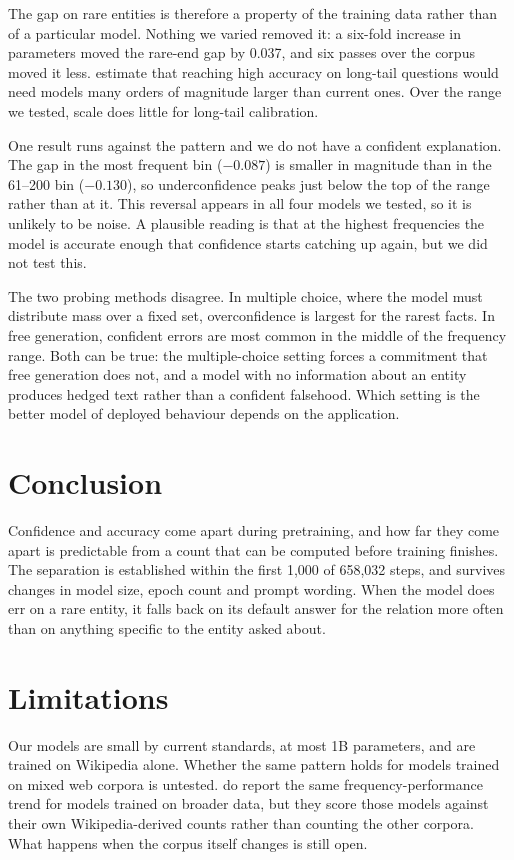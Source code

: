 \documentclass[11pt]{article}
\begin{document}
The gap on rare entities is therefore a property of the training data rather than of a
particular model. Nothing we varied removed it: a six-fold increase in parameters moved the
rare-end gap by 0.037, and six passes over the corpus moved it less. \citet{kandpal-etal-2023-large} estimate that reaching high accuracy on long-tail questions
would need models many orders of magnitude larger than current ones. Over the range we tested,
scale does little for long-tail calibration.

One result runs against the pattern and we do not have a confident explanation. The gap in the
most frequent bin ($-0.087$) is smaller in magnitude than in the 61--200 bin ($-0.130$), so
underconfidence peaks just below the top of the range rather than at it. This reversal appears in
all four models we tested, so it is unlikely to be noise. A plausible reading is that at the highest
frequencies the model is accurate enough that confidence starts catching up again, but we did not
test this.

The two probing methods disagree. In multiple choice, where the model
must distribute mass over a fixed set, overconfidence is largest for the rarest facts. In free
generation, confident errors are most common in the middle of the frequency range. Both can be
true: the multiple-choice setting forces a commitment that free generation does not, and a model
with no information about an entity produces hedged text rather than a confident falsehood. Which
setting is the better model of deployed behaviour depends on the application.

\section{Conclusion}

Confidence and accuracy come apart during pretraining, and how far they come apart is predictable
from a count that can be computed before training finishes. The separation is established within
the first 1{,}000 of 658{,}032 steps, and survives changes in model size, epoch count and prompt
wording. When the model does err on a rare entity, it falls back on its default answer for the
relation more often than on anything specific to the entity asked about.

\section*{Limitations}

Our models are small by current standards, at most 1B parameters, and are trained on Wikipedia
alone. Whether the same pattern holds for models trained on mixed web corpora is untested.
\citet{gottesman-etal-2026-lment} do report the same frequency-performance trend for models
trained on broader data, but they score those models against their own Wikipedia-derived counts
rather than counting the other corpora. What happens when the corpus itself changes is still
open.
\end{document}
